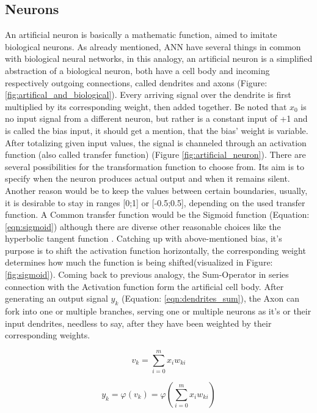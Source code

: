 \subsection{Neurons}
An artificial neuron is basically a mathematic function, aimed to imitate biological neurons.
As already mentioned, ANN have several things in common with biological neural networks, in this analogy, an artificial neuron is a simplified abstraction of a biological neuron, both have a cell body and incoming respectively outgoing connections, called dendrites and axons \cite{nntutorial} (Figure: \ref{fig:artifical_and_biological}). Every arriving signal over the dendrite is first multiplied by its corresponding weight, then added together. Be noted that $x_{0}$ is no input signal from a different neuron, but rather is a constant input of +1 and is called the bias input, it should get a mention, that the bias' weight is variable. \newline
After totalizing given input values, the signal is channeled through an activation function (also called transfer function) (Figure \ref{fig:artificial_neuron}). There are several possibilities for the transformation function to choose from. Its aim is to specify when the neuron produces actual output and when it remains silent. Another reason would be to keep the values between certain boundaries, usually, it is desirable to stay in ranges [0;1] or [-0.5;0.5], depending on the used transfer function. A Common transfer function would be the Sigmoid function (Equation: \ref{eqn:sigmoid}) although there are diverse other reasonable choices like the hyperbolic tangent function \cite{nntutorial}. Catching up with above-mentioned bias, it's purpose is to shift the activation function horizontally, the corresponding weight determines how much the function is being shifted(visualized in Figure: \ref{fig:sigmoid}). Coming back to previous analogy, the Sum-Operator in series connection with the Activation function form the artificial cell body.\newline 
After generating an output signal $y_{k}$ (Equation: \ref{eqn:dendrites_sum}), the Axon can fork into one or multiple branches, serving one or multiple neurons as it's or their input dendrites, needless to say,  after they have been weighted by their corresponding weights.   


\begin{equation}
\label{eqn:vk}
v_{k} = \sum_{i=0}^{m} x_{i} w_{ki}
\end{equation}  

\begin{equation}
\label{eqn:dendrites_sum}
y_{k} = \varphi(v_{k}) = \varphi(\sum_{i=0}^{m} x_{i} w_{ki}) 
\end{equation} 

